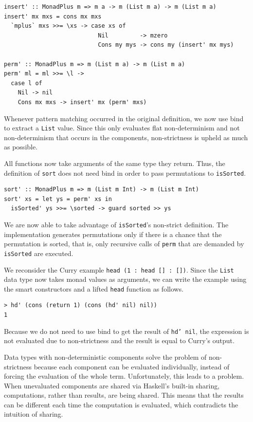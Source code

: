 \documentclass[a4paper, 11pt, fleqn, twoside]{scrreprt}
\newcommand{\hinl}[1]{\texttt{#1}}
\begin{document}
\begin{verbatim}
insert' :: MonadPlus m => m a -> m (List m a) -> m (List m a)
insert' mx mxs = cons mx mxs
  `mplus` mxs >>= \xs -> case xs of
                           Nil         -> mzero
                           Cons my mys -> cons my (insert' mx mys)

perm' :: MonadPlus m => m (List m a) -> m (List m a)
perm' ml = ml >>= \l ->
  case l of
    Nil -> nil
    Cons mx mxs -> insert' mx (perm' mxs)
\end{verbatim}

Whenever pattern matching occurred in the original definition, we now use bind 
to extract a \hinl{List} value. Since this only evaluates flat 
non-determinism and not non-determinism that occurs in the components, 
non-strictness is upheld as much as possible. 

All functions now take arguments of the same type they return. Thus, the 
definition of \hinl{sort} does not need bind in order to pass 
permutations to \hinl{isSorted}.

\begin{verbatim}
sort' :: MonadPlus m => m (List m Int) -> m (List m Int)
sort' xs = let ys = perm' xs in
  isSorted' ys >>= \sorted -> guard sorted >> ys
\end{verbatim}

We are now able to take advantage of \hinl{isSorted}'s non-strict
definition. The implementation generates permutations only if there is a chance 
that the permutation is sorted, that is, only recursive calls of 
\hinl{perm} that are demanded by \hinl{isSorted} are executed.

We reconsider the Curry example \hinl{head (1 : head [] : [])}. Since the 
\hinl{List} data type now takes monad values as arguments, we can write the 
example using the smart constructors and a lifted \hinl{head} function as 
follows.

\begin{verbatim}
> hd' (cons (return 1) (cons (hd' nil) nil))
1
\end{verbatim}

Because we do not need to use bind to get the result of \hinl{hd' nil}, the 
expression is not evaluated due to non-strictness and the result is equal to 
Curry's output.

Data types with non-deterministic components solve the problem of 
non-strictness because each component can be evaluated individually, instead of 
forcing the evaluation of the whole term. Unfortunately, this leads to a 
problem. When unevaluated components are shared via Haskell's built-in sharing, 
computations, rather than results, are being shared. This means that the 
results can be different each time the computation is evaluated, which 
contradicts the intuition of sharing.
\end{document}

